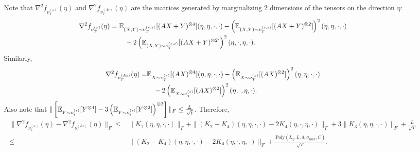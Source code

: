 Note that $\nabla^2f_{\nu_T^{(x)}}(\eta)$ and $\nabla^2f_{\nu_T^{(As)}}(\eta)$ are the matrices generated by marginalizing 2 dimensions of the tensors on the direction $\eta$:  
\begin{align*}
\nabla^2f_{\nu_T^{(x)}}(\eta) =\, &\, \mathbb{E}_{(X,Y)\sim \nu_T^{(s,\epsilon)}} [(AX+Y)^{\otimes 4}](\eta,\eta,\cdot,\cdot) - \left( \mathbb{E}_{(X,Y)\sim \nu_T^{(s,\epsilon)}} [(AX+Y)^{\otimes 2}]\right)^2 (\eta,\eta,\cdot,\cdot) \\
& \quad - 2\left( \mathbb{E}_{(X,Y)\sim \nu_T^{(s,\epsilon)}} [(AX+Y)^{\otimes 2}]\right)^2 (\eta,\cdot,\eta,\cdot).
\end{align*}
Similarly, 
\begin{align*}
\nabla^2f_{\nu_T^{(As)}}(\eta) = & \mathbb{E}_{X\sim \nu_T^{(s)}}[(AX)^{\otimes 4}](\eta,\eta,\cdot,\cdot) - \left(\mathbb{E}_{X\sim \nu_T^{(s)}}[(AX)^{\otimes 2}]\right)^2(\eta,\eta,\cdot,\cdot) \\
& \quad - 2 \left(\mathbb{E}_{X\sim \nu_T^{(s)}}[(AX)^{\otimes 2}]\right)^2(\eta,\cdot,\eta,\cdot). 
\end{align*}
Also note that $\| \left[\mathbb{E}_{Y\sim \nu_t^{(\epsilon)}}[Y^{\otimes 4}] - 3\left(\mathbb{E}_{Y\sim \nu_t^{(\epsilon)}}[Y^{\otimes 2}]\right)^{\otimes 2} \right]\|_F \le \frac{L}{\sqrt{t}}$.
Therefore,
\begin{align*}
\|\nabla^2f_{\nu_T^{(x)}}(\eta) -  \nabla^2f_{\nu_T^{(As)}}(\eta) \|_F \le & \|K_1(\eta,\eta,\cdot, \cdot)\|_F + \|(K_2-K_4)(\eta,\eta,\cdot, \cdot) - 2K_4(\eta,\cdot,\eta,\cdot)\|_F + 3 \|K_3(\eta,\eta,\cdot, \cdot)\|_F + \frac{L}{\sqrt{T}}\\
\le & \|(K_2-K_4)(\eta,\eta,\cdot, \cdot) - 2K_4(\eta,\cdot,\eta,\cdot)\|_F + \frac{\text{Poly}(L_{\eta}, L, d, \sigma_{\max}, C)}{\sqrt{T}}.
\end{align*}

